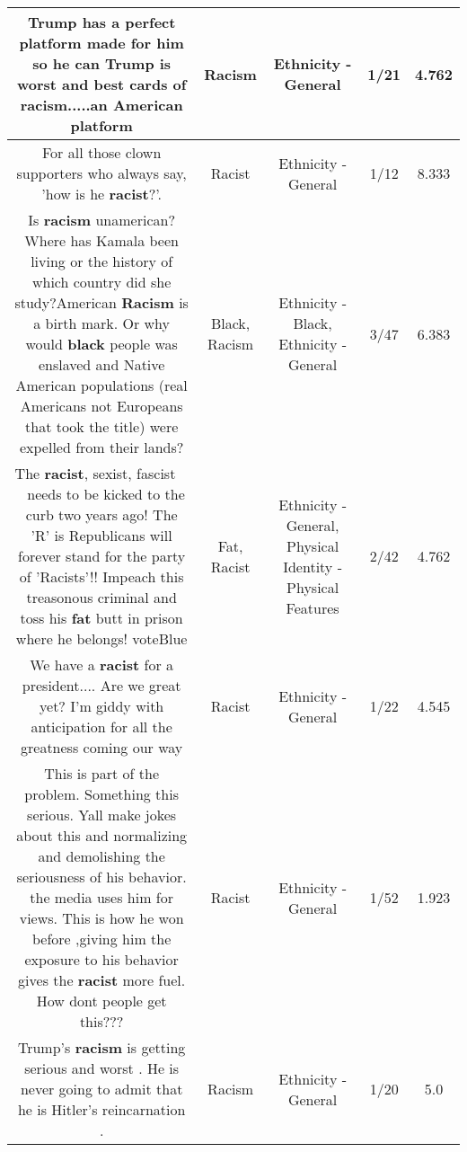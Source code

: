 \documentclass[11pt]{article}
\newlength\mylength
\begin{document}
\begin{center}
\begin{longtable}{|C{.65\mylength}|C{.30\mylength}|C{.12\mylength}|C{.12\mylength}|C{.12\mylength}|}
  \small Trump has a perfect platform made for him so he can Trump is worst and best cards of \textbf{racism}.....an American platform\normalsize   & Racism & Ethnicity - General & 1/21 & 4.762 \\  \hline
  \small For all those clown supporters who always say, 'how is he \textbf{racist}?'.\normalsize   & Racist & Ethnicity - General & 1/12 & 8.333 \\  \hline
  \small Is \textbf{racism} unamerican? Where has Kamala been living or the history of which country did she study?American \textbf{Racism} is a birth mark. Or why would \textbf{black} people was enslaved and Native American populations (real Americans not Europeans that took the title) were expelled from their lands?\normalsize   & Black, Racism & Ethnicity - Black, Ethnicity - General & 3/47 & 6.383 \\  \hline
  \small The \textbf{racist}, sexist, fascist 👶🍊💩 needs to be kicked to the curb two years ago! The 'R' is Republicans will forever stand for the party of 'Racists'!! Impeach this treasonous criminal and toss his \textbf{fat} butt in prison where he belongs! voteBlue\normalsize   & Fat, Racist & Ethnicity - General, Physical Identity - Physical Features & 2/42 & 4.762 \\  \hline
  \small We have a \textbf{racist} for a president.... Are we great yet? I'm giddy with anticipation for all the greatness coming our way\normalsize   & Racist & Ethnicity - General & 1/22 & 4.545 \\  \hline
  \small This is part of the problem. Something this serious. Yall make jokes about this and normalizing and demolishing the seriousness of his behavior. the media uses him for views. This is how he won before ,giving him the exposure to his behavior gives  the \textbf{racist} more fuel. How dont people get this???\normalsize   & Racist & Ethnicity - General & 1/52 & 1.923 \\  \hline
  \small Trump's \textbf{racism} is getting serious and worst . He is never going to admit that he is Hitler's reincarnation .\normalsize   & Racism & Ethnicity - General & 1/20 & 5.0 \\  \hline

\end{longtable}
\end{center}
\end{document}
